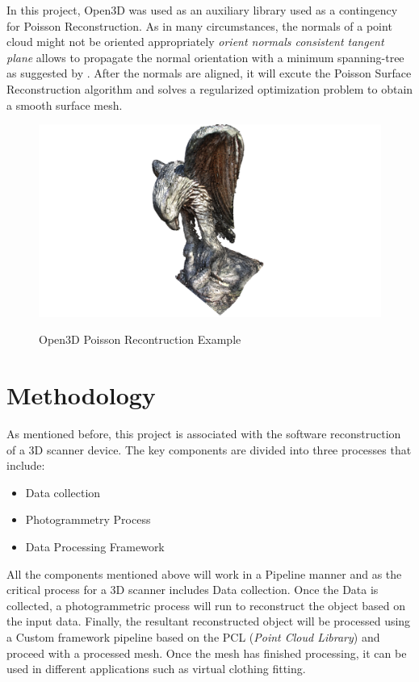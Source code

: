 \documentclass[12pt]{report}
\begin{document}
In this project, Open3D was used as an auxiliary library used as a contingency for Poisson Reconstruction. 
As in many circumstances, the normals of a point cloud might not be oriented appropriately \textit{orient normals consistent tangent plane} allows to propagate the normal orientation with a minimum
spanning-tree as suggested by . 
After the normals are aligned, it will excute the Poisson Surface Reconstruction algorithm  and solves a regularized optimization problem to obtain a smooth surface mesh. 

\begin{figure}[H]%
  \centering
  \includegraphics[width=1\textwidth]{open3dpoisson.png}
 \caption{Open3D Poisson Recontruction Example}\cite[]{Zhou2018}
 \label{fig:Possion_exampple} 
\end{figure}




\chapter{Methodology}
As mentioned before, this project is associated with the software reconstruction of a 3D scanner device.
The key components are divided into three processes that include:

\begin{itemize}
  \item Data collection
  \item Photogrammetry Process
  \item Data Processing Framework
\end{itemize}

All the components mentioned above will work in a Pipeline manner and as the critical process for a 3D scanner includes  Data collection. 
Once the Data is collected, a photogrammetric process will run to reconstruct the object based on the input data. 
Finally, the resultant reconstructed object will be processed using a Custom framework pipeline based on the PCL (\textit{Point Cloud Library}) and proceed with a processed mesh.
Once the mesh has finished processing, it can be used in different applications such as virtual clothing fitting.
\end{document}
